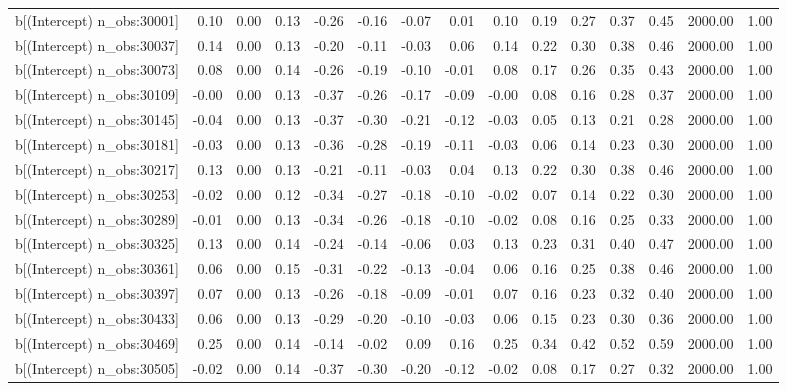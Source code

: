 \begin{table}[ht]
\begin{tabular}{rrrrrrrrrrrrrrr}
  b[(Intercept) n\_obs:30001] & 0.10 & 0.00 & 0.13 & -0.26 & -0.16 & -0.07 & 0.01 & 0.10 & 0.19 & 0.27 & 0.37 & 0.45 & 2000.00 & 1.00 \\ 
  b[(Intercept) n\_obs:30037] & 0.14 & 0.00 & 0.13 & -0.20 & -0.11 & -0.03 & 0.06 & 0.14 & 0.22 & 0.30 & 0.38 & 0.46 & 2000.00 & 1.00 \\ 
  b[(Intercept) n\_obs:30073] & 0.08 & 0.00 & 0.14 & -0.26 & -0.19 & -0.10 & -0.01 & 0.08 & 0.17 & 0.26 & 0.35 & 0.43 & 2000.00 & 1.00 \\ 
  b[(Intercept) n\_obs:30109] & -0.00 & 0.00 & 0.13 & -0.37 & -0.26 & -0.17 & -0.09 & -0.00 & 0.08 & 0.16 & 0.28 & 0.37 & 2000.00 & 1.00 \\ 
  b[(Intercept) n\_obs:30145] & -0.04 & 0.00 & 0.13 & -0.37 & -0.30 & -0.21 & -0.12 & -0.03 & 0.05 & 0.13 & 0.21 & 0.28 & 2000.00 & 1.00 \\ 
  b[(Intercept) n\_obs:30181] & -0.03 & 0.00 & 0.13 & -0.36 & -0.28 & -0.19 & -0.11 & -0.03 & 0.06 & 0.14 & 0.23 & 0.30 & 2000.00 & 1.00 \\ 
  b[(Intercept) n\_obs:30217] & 0.13 & 0.00 & 0.13 & -0.21 & -0.11 & -0.03 & 0.04 & 0.13 & 0.22 & 0.30 & 0.38 & 0.46 & 2000.00 & 1.00 \\ 
  b[(Intercept) n\_obs:30253] & -0.02 & 0.00 & 0.12 & -0.34 & -0.27 & -0.18 & -0.10 & -0.02 & 0.07 & 0.14 & 0.22 & 0.30 & 2000.00 & 1.00 \\ 
  b[(Intercept) n\_obs:30289] & -0.01 & 0.00 & 0.13 & -0.34 & -0.26 & -0.18 & -0.10 & -0.02 & 0.08 & 0.16 & 0.25 & 0.33 & 2000.00 & 1.00 \\ 
  b[(Intercept) n\_obs:30325] & 0.13 & 0.00 & 0.14 & -0.24 & -0.14 & -0.06 & 0.03 & 0.13 & 0.23 & 0.31 & 0.40 & 0.47 & 2000.00 & 1.00 \\ 
  b[(Intercept) n\_obs:30361] & 0.06 & 0.00 & 0.15 & -0.31 & -0.22 & -0.13 & -0.04 & 0.06 & 0.16 & 0.25 & 0.38 & 0.46 & 2000.00 & 1.00 \\ 
  b[(Intercept) n\_obs:30397] & 0.07 & 0.00 & 0.13 & -0.26 & -0.18 & -0.09 & -0.01 & 0.07 & 0.16 & 0.23 & 0.32 & 0.40 & 2000.00 & 1.00 \\ 
  b[(Intercept) n\_obs:30433] & 0.06 & 0.00 & 0.13 & -0.29 & -0.20 & -0.10 & -0.03 & 0.06 & 0.15 & 0.23 & 0.30 & 0.36 & 2000.00 & 1.00 \\ 
  b[(Intercept) n\_obs:30469] & 0.25 & 0.00 & 0.14 & -0.14 & -0.02 & 0.09 & 0.16 & 0.25 & 0.34 & 0.42 & 0.52 & 0.59 & 2000.00 & 1.00 \\ 
  b[(Intercept) n\_obs:30505] & -0.02 & 0.00 & 0.14 & -0.37 & -0.30 & -0.20 & -0.12 & -0.02 & 0.08 & 0.17 & 0.27 & 0.32 & 2000.00 & 1.00 \\ 

\end{tabular}
\end{table}
